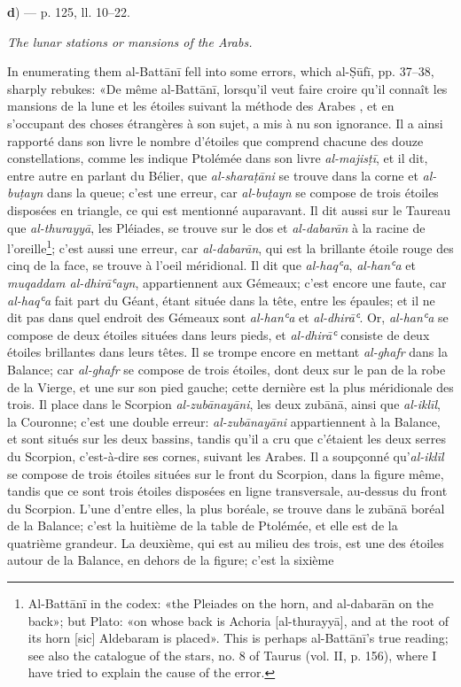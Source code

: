 \documentclass[11pt]{article}
\newcommand{\Pg}[1]{\marginpar{\footnotesize\color{gray}#1}}
\begin{document}
\par\begin{center}\textbf{d}) — p. 125, ll. 10–22.\end{center}
\par \emph{The lunar stations or mansions of the Arabs.}\par
\par \Pg{I 296}In enumerating them al-Battānī fell into some errors, which al-Ṣūfī, pp. 37–38, sharply rebukes: «De même al-Battānī, lorsqu’il veut faire croire qu’il connaît les mansions de la lune et les étoiles suivant la méthode des Arabes , et en s’occupant des choses étrangères à son sujet, a mis à nu son ignorance. Il a ainsi rapporté dans son livre le nombre d’étoiles que comprend chacune des douze constellations, comme les indique Ptolémée dans son livre \emph{al-majisṭī}, et il dit, entre autre en parlant du Bélier, que \emph{al-sharaṭāni} se trouve dans la corne et \emph{al-buṭayn} dans la queue; c’est une erreur, car \emph{al-buṭayn} se compose de trois étoiles disposées en triangle, ce qui est mentionné auparavant. Il dit aussi sur le Taureau que \emph{al-thurayyā}, les Pléiades, se trouve sur le dos et \emph{al-dabarān} à la racine de l’oreille\footnote{Al-Battānī in the codex: «the Pleiades on the horn, and al-dabarān on the back»; but Plato: «on whose back is Achoria [al-thurayyā], and at the root of its horn [sic] Aldebaram is placed». This is perhaps al-Battānī's true reading; see also the catalogue of the stars, no. 8 of Taurus (vol. II, p. 156), where I have tried to explain the cause of the error.}; c’est aussi une erreur, car \emph{al-dabarān}, qui est la brillante étoile rouge des cinq de la face, se trouve à l’oeil méridional. Il dit que \emph{al-haqʿa}, \emph{al-hanʿa} et \emph{muqaddam al-dhirāʿayn}, appartiennent aux Gémeaux; c’est encore une faute, car \emph{al-haqʿa} fait part du Géant, étant située dans la tête, entre les épaules; et il ne dit pas dans quel endroit des Gémeaux sont \emph{al-hanʿa} et \emph{al-dhirāʿ}. Or, \emph{al-hanʿa} se compose de deux étoiles situées dans leurs pieds, et \emph{al-dhirāʿ} consiste de deux étoiles brillantes dans leurs têtes. Il se trompe encore en mettant \emph{al-ghafr} dans la Balance; car \emph{al-ghafr} se compose de trois étoiles, dont deux sur le pan de la robe  de la Vierge, et une sur son pied gauche; cette dernière est la plus méridionale des trois. Il place dans le Scorpion \emph{al-zubānayāni}, les deux zubānā, ainsi que \emph{al-iklīl}, la Couronne; c’est une double erreur: \emph{al-zubānayāni} appartiennent à la Balance, et sont situés sur les deux bassins, tandis qu’il a cru que c’étaient les deux serres du Scorpion, c’est-à-dire ses cornes, suivant les Arabes. Il a soupçonné qu’\emph{al-iklīl} se compose de trois étoiles situées sur le front du Scorpion, dans la figure même, tandis que ce sont trois étoiles disposées en ligne transversale, au-dessus du front du Scorpion. L’une d’entre elles, la plus boréale, se trouve dans le zubānā boréal de la Balance; c’est la huitième de la table de Ptolémée, et elle est de la quatrième grandeur. La deuxième, qui est au milieu des trois, est une des étoiles autour de la Balance, en dehors de la figure; c’est la sixième 
\end{document}
